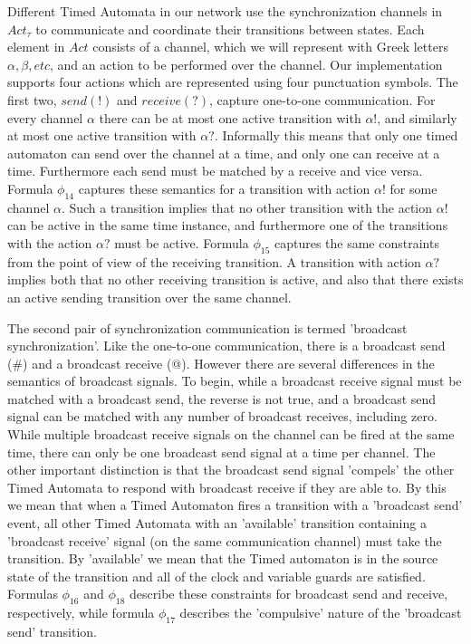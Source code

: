 \documentclass[a4paper,12pt]{article}
\begin{document}
Different Timed Automata in our network use the synchronization channels in
\(Act_\tau\) to communicate and coordinate their transitions between states.
Each element in \(Act\) consists of a channel, which we will represent with
Greek letters \(\alpha, \beta, etc\), and an action to be performed over the
channel. Our implementation supports four actions which are represented using
four punctuation symbols. The first two, \(send(!)\) and \(receive(?)\), capture
one-to-one communication. For every channel \(\alpha\) there can be at most one
active transition with \(\alpha!\), and similarly at most one active transition
with \(\alpha?\). Informally this means that only one timed automaton can send
over the channel at a time, and only one can receive at a time. Furthermore each
send must be matched by a receive and vice versa. Formula \(\phi_{14}\) captures
these semantics for a transition with action \(\alpha!\) for some channel
\(\alpha\). Such a transition implies that no other transition with the action
\(\alpha!\) can be active in the same time instance, and furthermore one of the
transitions with the action \(\alpha?\) must be active. Formula \(\phi_{15}\)
captures the same constraints from the point of view of the receiving
transition. A transition with action \(\alpha?\) implies both that no other
receiving transition is active, and also that there exists an active sending
transition over the same channel.

The second pair of synchronization communication is termed 'broadcast
synchronization'. Like the one-to-one communication, there is a broadcast send
(\#) and a broadcast receive (@). However there are several differences in the
semantics of broadcast signals. To begin, while a broadcast receive signal must
be matched with a broadcast send, the reverse is not true, and a broadcast send
signal can be matched with any number of broadcast receives, including zero.
While multiple broadcast receive signals on the channel can be fired at the same
time, there can only be one broadcast send signal at a time per channel. The
other important distinction is that the broadcast send signal 'compels' the
other Timed Automata to respond with broadcast receive if they are able to. By
this we mean that when a Timed Automaton fires a transition with a 'broadcast
send' event, all other Timed Automata with an 'available' transition containing
a 'broadcast receive' signal (on the same communication channel) must take the
transition. By 'available' we mean that the Timed automaton is in the source
state of the transition and all of the clock and variable guards are satisfied.
Formulas \(\phi_{16}\) and \(\phi_{18}\) describe these constraints for
broadcast send and receive, respectively, while formula \(\phi_{17}\) describes
the 'compulsive' nature of the 'broadcast send' transition.
\end{document}
